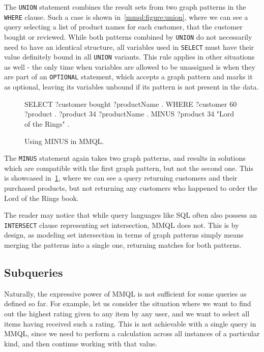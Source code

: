 The \texttt{UNION} statement combines the result sets from two graph patterns in the \texttt{WHERE} clause.
Such a case is shown in~\cref{mmql:figure:union}, where we can see a query selecting a list of product names for each customer, that the customer bought or reviewed.
While both patterns combined by \texttt{UNION} do not necessarily need to have an identical structure, all variables used in \texttt{SELECT} must have their value definitely bound in all \texttt{UNION} variants.
This rule applies in other situations as well - the only time when variables are allowed to be unassigned is when they are part of an \texttt{OPTIONAL} statement, which accepts a graph pattern and marks it as optional, leaving its variables unbound if its pattern is not present in the data.

\begin{figure}[ht]
\begin{code}
SELECT {
    ?customer bought ?productName .
}
WHERE {
    ?customer 60 ?product .
    ?product 34 ?productName .
    MINUS {
        ?product 34 "Lord of the Rings" .
    }
}
\end{code}
\caption{Using MINUS in MMQL.}\label{mmql:figure:minus}
\end{figure}

The \texttt{MINUS} statement again takes two graph patterns, and results in solutions which are compatible with the first graph pattern, but not the second one.
This is showcased in~\cref{mmql:figure:minus}, where we can see a query returning customers and their purchased products, but not returning any customers who happened to order the Lord of the Rings book.

The reader may notice that while query languages like SQL often also possess an \texttt{INTERSECT} clause representing set intersection, MMQL does not.
This is by design, as modeling set intersection in terms of graph patterns simply means merging the patterns into a single one, returning matches for both patterns.

\subsection{Subqueries}

Naturally, the expressive power of MMQL is not sufficient for some queries as defined so far.
For example, let us consider the situation where we want to find out the highest rating given to any item by any user, and we want to select all items having received such a rating.
This is not achievable with a single query in MMQL, since we need to perform a calculation across all instances of a particular kind, and then continue working with that value.

